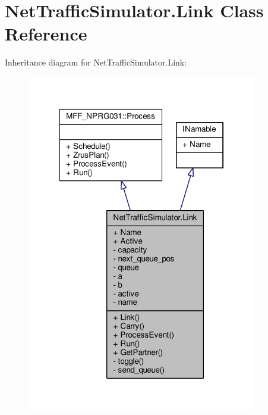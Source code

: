 \hypertarget{classNetTrafficSimulator_1_1Link}{\section{Net\-Traffic\-Simulator.\-Link Class Reference}
\label{classNetTrafficSimulator_1_1Link}
}


Inheritance diagram for Net\-Traffic\-Simulator.\-Link\-:\nopagebreak
\begin{figure}[H]
\begin{center}
\leavevmode
\includegraphics[width=285pt]{classNetTrafficSimulator_1_1Link__inherit__graph}
\end{center}
\end{figure}


